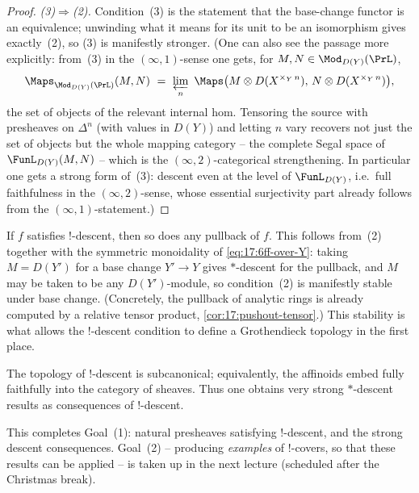 \begin{proof}
\emph{(3)$\Rightarrow$(2).} Condition~(3) is the statement that the base-change functor is an
equivalence; unwinding what it means for its unit to be an isomorphism gives exactly~(2), so
(3) is manifestly stronger. (One can also see the passage more explicitly: from~(3) in the
$(\infty,1)$-sense one gets, for $M,N\in\Mod_{D(Y)}(\PrL)$,
\begin{equation*}
\Maps_{\Mod_{D(Y)}(\PrL)}(M,N)\ =\ \varprojlim_{n}\ \Maps\bigl(M\otimes D(X^{\times_{Y}\,n}),\,N\otimes D(X^{\times_{Y}\,n})\bigr),
\end{equation*}
the set of objects of the relevant internal hom. Tensoring the source with presheaves on
$\Delta^{n}$ (with values in $D(Y)$) and letting $n$ vary recovers not just the set of
objects but the whole mapping category -- the complete Segal space of
$\FunL_{D(Y)}(M,N)$ -- which is the $(\infty,2)$-categorical strengthening. In particular one
gets a strong form of~(3): descent even at the level of $\FunL_{D(Y)}$, i.e.\ full
faithfulness in the $(\infty,2)$-sense, whose essential surjectivity part already follows
from the $(\infty,1)$-statement.)
\end{proof}

\begin{corollary}
\label{cor:17:descent-pullback}
If $f$ satisfies $!$-descent, then so does any pullback of $f$. This follows from~(2) together
with the symmetric monoidality of \eqref{eq:17:6ff-over-Y}: taking $M=D(Y')$ for a base change
$Y'\to Y$ gives $*$-descent for the pullback, and $M$ may be taken to be any
$D(Y')$-module, so condition~(2) is manifestly stable under base change. (Concretely, the
pullback of analytic rings is already computed by a relative tensor product,
\cref{cor:17:pushout-tensor}.) This stability is what allows the $!$-descent condition to
define a Grothendieck topology in the first place.
\end{corollary}

\begin{corollary}[Subcanonicity]
\label{cor:17:subcanonical}
The topology of $!$-descent is subcanonical; equivalently, the affinoids embed fully
faithfully into the category of sheaves. Thus one obtains very strong $*$-descent results as
consequences of $!$-descent.
\end{corollary}

\begin{remark}
\label{rmk:17:next-time}
This completes Goal~(1): natural presheaves satisfying $!$-descent, and the strong descent
consequences. Goal~(2) -- producing \emph{examples} of $!$-covers, so that these results can
be applied -- is taken up in the next lecture (scheduled after the Christmas break).
\end{remark}
